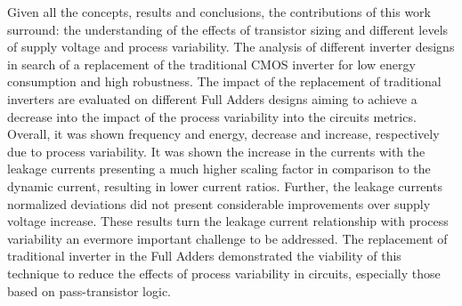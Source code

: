 \documentclass[diss,pgmicro,english]{iiufrgs}
\begin{document}
\begin{table}[]
\centering
\caption{Current results for the FAs considering the product between measures and deviations for dynamic and static currents.}
\label{tab:FACurr}
\end{table}

Given all the concepts, results and conclusions, the contributions of this work surround: the understanding of the effects of transistor sizing and different levels of supply voltage and process variability. The analysis of different inverter designs in search of a replacement of the traditional CMOS inverter for low energy consumption and high robustness. The impact of the replacement of traditional inverters are evaluated on different Full Adders designs aiming to achieve a decrease into the impact of the process variability into the circuits metrics. Overall, it was shown frequency and energy, decrease and increase, respectively due to process variability. It was shown the increase in the currents with the leakage currents presenting a much higher scaling factor in comparison to the dynamic current, resulting in lower current ratios. Further, the leakage currents normalized deviations did not present considerable improvements over supply voltage increase. These results turn the leakage current relationship with process variability an evermore important challenge to be addressed. The replacement of traditional inverter in the Full Adders demonstrated the viability of this technique to reduce the effects of process variability in circuits, especially those based on pass-transistor logic.
\end{document}

